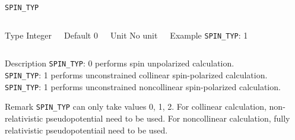 \documentclass[xcolor=dvipsnames,t]{beamer}
\begin{document}
\begin{frame}[allowframebreaks]{\texttt{SPIN\_TYP}} \label{SPIN_TYP}
\vspace*{-12pt}
\begin{columns}
\begin{block}{Type}
Integer
\end{block}

\begin{block}{Default}
0
\end{block}

\begin{block}{Unit}
No unit
\end{block}

\begin{block}{Example}
\texttt{SPIN\_TYP}: 1
\end{block}
\end{columns}

\begin{block}{Description}
\texttt{SPIN\_TYP}: 0 performs spin unpolarized calculation. \\
\texttt{SPIN\_TYP}: 1 performs unconstrained collinear spin-polarized calculation.  \\
\texttt{SPIN\_TYP}: 1 performs unconstrained noncollinear spin-polarized calculation.   
\end{block}

\begin{block}{Remark}
\texttt{SPIN\_TYP} can only take values 0, 1, 2. For collinear calculation, non-relativistic pseudopotential need to be used. For noncollinear calculation, fully relativistic pseudopotentiail need to be used. 
\end{block}

\end{frame}
\end{document}
